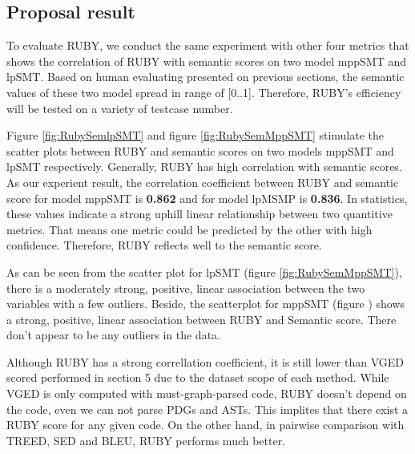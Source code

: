 \subsection{Proposal result}
To evaluate RUBY, we conduct the same experiment with other four metrics that shows the correlation of RUBY with semantic scores on two model mppSMT and lpSMT. Based on human evaluating presented on previous sections, the semantic values of these two model spread in range of [0..1]. Therefore, RUBY's efficiency will be tested on a variety of testcase number.  	


Figure \ref{fig:RubySemlpSMT} and figure \ref{fig:RubySemMppSMT} stimulate the scatter plots between RUBY and semantic scores on two models mppSMT and lpSMT respectively. Generally, RUBY has high correlation with semantic scores. As our experient result, the correlation coefficient between RUBY and semantic score for model mppSMT is \textbf{0.862} and for model lpMSMP is \textbf{0.836}. In statistics, these values indicate a strong uphill linear relationship between two quantitive metrics. That means one metric could be predicted by the other with high confidence. Therefore, RUBY reflects well to the semantic score.


As can be seen from the scatter plot for lpSMT (figure \ref{fig:RubySemMppSMT}), there is a moderately strong, positive, linear association between the two variables with a few outliers.  
Beside, the scatterplot for mppSMT (figure ) shows a strong, positive, linear association between RUBY and Semantic score. There don't appear to be any outliers in the data.

Although RUBY has a strong correllation coefficient, it is still lower than VGED scored performed in section 5 due to the dataset scope of each method. While VGED is only computed with must-graph-parsed code, RUBY doesn't depend on the code, even we can not parse PDGs and ASTs. This implites that there exist a RUBY score for any given code. On the other hand, in pairwise comparison with TREED, SED and BLEU, RUBY performs much better.
	    
  			